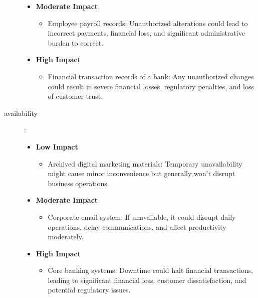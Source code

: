 \documentclass{article}
\begin{document}
\begin{description}
\begin{itemize}
                                \item \textbf{Moderate Impact}
                                \begin{itemize}
                                    \item Employee payroll records: Unauthorized alterations could lead to incorrect payments, financial loss, and significant administrative burden to correct.
                                \end{itemize}
                            
                                \item \textbf{High Impact}
                                \begin{itemize}
                                    \item Financial transaction records of a bank: Any unauthorized changes could result in severe financial losses, regulatory penalties, and loss of customer trust.
                                \end{itemize}
                            \end{itemize}  
                            \item[availability]: \\  
                            \begin{itemize}
                                \item \textbf{Low Impact}
                                \begin{itemize}
                                    \item Archived digital marketing materials: Temporary unavailability might cause minor inconvenience but generally won't disrupt business operations.
                                \end{itemize}
                            
                                \item \textbf{Moderate Impact}
                                \begin{itemize}
                                    \item Corporate email system: If unavailable, it could disrupt daily operations, delay communications, and affect productivity moderately.
                                \end{itemize}
                            
                                \item \textbf{High Impact}
                                \begin{itemize}
                                    \item Core banking systems: Downtime could halt financial transactions, leading to significant financial loss, customer dissatisfaction, and potential regulatory issues.
                                \end{itemize}
                            \end{itemize}
                                      
                        \end{description}
                        
\end{document}
